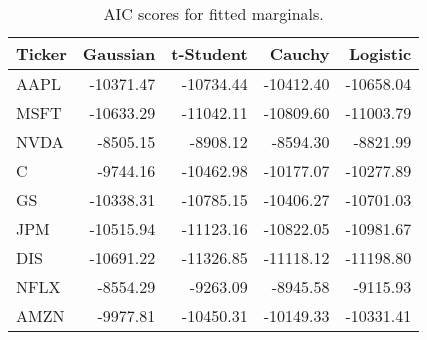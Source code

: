 \begin{table}[H]

\caption{AIC scores for fitted marginals.}
\centering
\fontsize{11}{13}\selectfont
\begin{tabular}[t]{lrrrr}
\toprule
Ticker & Gaussian & t-Student & Cauchy & Logistic\\
\midrule
AAPL & -10371.47 & -10734.44 & -10412.40 & -10658.04\\
MSFT & -10633.29 & -11042.11 & -10809.60 & -11003.79\\
NVDA & -8505.15 & -8908.12 & -8594.30 & -8821.99\\
C & -9744.16 & -10462.98 & -10177.07 & -10277.89\\
GS & -10338.31 & -10785.15 & -10406.27 & -10701.03\\
JPM & -10515.94 & -11123.16 & -10822.05 & -10981.67\\
DIS & -10691.22 & -11326.85 & -11118.12 & -11198.80\\
NFLX & -8554.29 & -9263.09 & -8945.58 & -9115.93\\
AMZN & -9977.81 & -10450.31 & -10149.33 & -10331.41\\
\bottomrule
\end{tabular}
\end{table}
